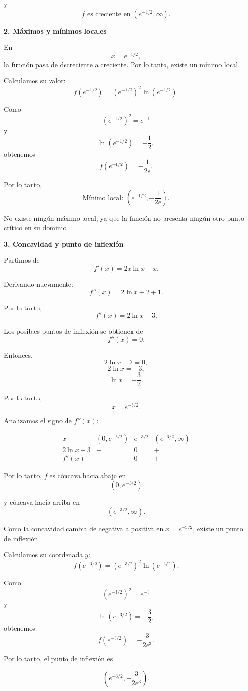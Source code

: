 \documentclass[12pt]{article}
\begin{document}
\begin{enumerate}[label=\roman*.-]
    y
    \[
    \boxed{
    f \text{ es creciente en }
    (e^{-1/2},\infty)
    }.
    \]

    \textbf{2. Máximos y mínimos locales}

    En
    \[
    x=e^{-1/2},
    \]
    la función pasa de decreciente a creciente. Por lo tanto,
    existe un mínimo local.

    Calculamos su valor:
    \[
    f(e^{-1/2})
    =
    (e^{-1/2})^2\ln(e^{-1/2}).
    \]

    Como
    \[
    (e^{-1/2})^2=e^{-1}
    \]
    y
    \[
    \ln(e^{-1/2})=-\frac12,
    \]
    obtenemos
    \[
    f(e^{-1/2})
    =
    -\frac{1}{2e}.
    \]

    Por lo tanto,
    \[
    \boxed{
    \text{Mínimo local: }
    \left(e^{-1/2},-\frac{1}{2e}\right)
    }.
    \]

    No existe ningún máximo local, ya que la función no presenta ningún
    otro punto crítico en su dominio.

    \textbf{3. Concavidad y punto de inflexión}

    Partimos de
    \[
    f'(x)=2x\ln x+x.
    \]

    Derivando nuevamente:
    \[
    f''(x)
    =
    2\ln x+2+1.
    \]

    Por lo tanto,
    \[
    f''(x)=2\ln x+3.
    \]

    Los posibles puntos de inflexión se obtienen de
    \[
    f''(x)=0.
    \]

    Entonces,
    \[
    2\ln x+3=0,
    \]
    \[
    2\ln x=-3,
    \]
    \[
    \ln x=-\frac32.
    \]

    Por lo tanto,
    \[
    x=e^{-3/2}.
    \]

    Analizamos el signo de $f''(x)$:

    \[
    \begin{array}{c|ccc}
    x & (0,e^{-3/2}) & e^{-3/2} & (e^{-3/2},\infty)\\
    \hline
    2\ln x+3 & - & 0 & +\\
    \hline
    f''(x) & - & 0 & +
    \end{array}
    \]

    Por lo tanto, $f$ es cóncava hacia abajo en
    \[
    \boxed{
    (0,e^{-3/2})
    }
    \]

    y cóncava hacia arriba en
    \[
    \boxed{
    (e^{-3/2},\infty)
    }.
    \]

    Como la concavidad cambia de negativa a positiva en
    $x=e^{-3/2}$, existe un punto de inflexión.

    Calculamos su coordenada $y$:
    \[
    f(e^{-3/2})
    =
    (e^{-3/2})^2\ln(e^{-3/2}).
    \]

    Como
    \[
    (e^{-3/2})^2=e^{-3}
    \]
    y
    \[
    \ln(e^{-3/2})=-\frac32,
    \]
    obtenemos
    \[
    f(e^{-3/2})
    =
    -\frac{3}{2e^3}.
    \]

    Por lo tanto, el punto de inflexión es

    \[
    \boxed{
    \left(e^{-3/2},-\frac{3}{2e^3}\right)
    }.
    \]

\end{enumerate}
\end{document}
